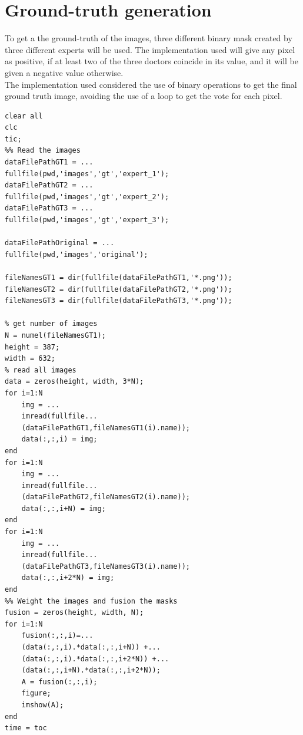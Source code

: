 \documentclass[a4paper, 10pt, conference]{ieeeconf}        %
\begin{document}
\section{Ground-truth generation}
To get a the ground-truth of the images, three different binary mask created by three different experts will be used. The implementation used will give any pixel as positive, if at least two of the three doctors coincide in its value, and it will be given a negative value otherwise.\\
The implementation used considered the use of binary operations to get the final ground truth image, avoiding the use of a loop to get the vote for each pixel.
\begin{lstlisting}
clear all
clc
tic;
%% Read the images
dataFilePathGT1 = ...
fullfile(pwd,'images','gt','expert_1');
dataFilePathGT2 = ...
fullfile(pwd,'images','gt','expert_2');
dataFilePathGT3 = ...
fullfile(pwd,'images','gt','expert_3');

dataFilePathOriginal = ...
fullfile(pwd,'images','original');

fileNamesGT1 = dir(fullfile(dataFilePathGT1,'*.png'));
fileNamesGT2 = dir(fullfile(dataFilePathGT2,'*.png'));
fileNamesGT3 = dir(fullfile(dataFilePathGT3,'*.png'));

% get number of images
N = numel(fileNamesGT1);
height = 387;                 
width = 632;
% read all images
data = zeros(height, width, 3*N);
for i=1:N    
    img = ...
    imread(fullfile...
    (dataFilePathGT1,fileNamesGT1(i).name));
    data(:,:,i) = img;
end
for i=1:N 
    img = ...
    imread(fullfile...
    (dataFilePathGT2,fileNamesGT2(i).name));
    data(:,:,i+N) = img;
end
for i=1:N 
    img = ...
    imread(fullfile...
    (dataFilePathGT3,fileNamesGT3(i).name));
    data(:,:,i+2*N) = img;
end
%% Weight the images and fusion the masks
fusion = zeros(height, width, N);
for i=1:N
    fusion(:,:,i)=...
    (data(:,:,i).*data(:,:,i+N)) +...
    (data(:,:,i).*data(:,:,i+2*N)) +...
    (data(:,:,i+N).*data(:,:,i+2*N));
    A = fusion(:,:,i);
    figure;
    imshow(A);
end
time = toc
\end{lstlisting}
\end{document}
